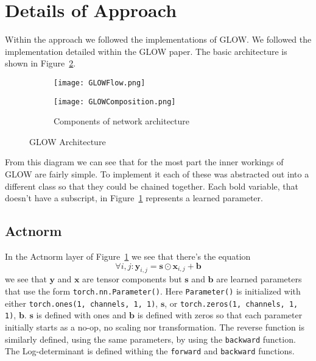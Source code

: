\section{Details of Approach}
Within the approach we followed the implementations of GLOW. We followed the
implementation detailed within the GLOW paper. The basic architecture is shown
in Figure~\ref{fig:glowarch}.

\begin{figure}
    \begin{subfigure}[]{\columnwidth}
        \center\texttt{[image: GLOWFlow.png]}
    \end{subfigure}
    \begin{subfigure}[]{\columnwidth}
        \addtocounter{subfigure}{2} 
        \center\texttt{[image: GLOWComposition.png]}
        \caption{Components of network architecture}
        \label{fig:glowcomp}
    \end{subfigure}
    \caption{GLOW Architecture}
    \label{fig:glowarch}
\end{figure}

From this diagram we can see that for the most part the inner workings of GLOW
are fairly simple. To implement it each of these was abstracted out into a
different class so that they could be chained together. Each bold variable, that
doesn't have a subscript, in Figure~\ref{fig:glowcomp} represents a learned
parameter. 
\subsection{Actnorm}
%
In the Actnorm layer of Figure~\ref{fig:glowcomp} we see
that there's the equation
%
\begin{equation}
 \forall i,j : \mathbf{y}_{i,j} = \mathbf{s} \odot \mathbf{x}_{i,j} + \mathbf{b}
\end{equation}
%
we see that $\mathbf{y}$ and $\mathbf{x}$ are tensor components but $\mathbf{s}$
and $\mathbf{b}$ are learned parameters that use the form
\lstinline[basicstyle=\ttfamily]|torch.nn.Parameter()|. Here
\lstinline[basicstyle=\ttfamily]|Parameter()| is initialized with either 
\lstinline[basicstyle=\ttfamily]|torch.ones(1, channels, 1, 1)|, $\mathbf{s}$, or
\lstinline[basicstyle=\ttfamily]|torch.zeros(1, channels, 1, 1)|, $\mathbf{b}$.
$\mathbf{s}$ is defined with ones and $\mathbf{b}$ is defined with zeros so that
each parameter initially starts as a no-op, no scaling nor transformation.
The reverse function is similarly defined, using the same parameters, by using
the \lstinline[basicstyle=\ttfamily]|backward| function. The Log-determinant is
defined withing the \lstinline[basicstyle=\ttfamily]|forward| and
\lstinline[basicstyle=\ttfamily]|backward| functions.

